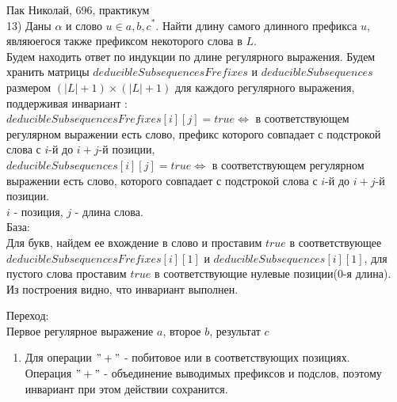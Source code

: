 \documentclass{article}
\begin{document}
	\LARGE
	\begin{flushleft}
		Пак Николай, 696, практикум \\
		13)  Даны $\alpha$ и слово $u \in {a,b,c}^*$. Найти длину самого длинного префикса $u$, являюегося также префиксом некоторого слова в $L$.\\
		
		
		Будем находить ответ по индукции по длине регулярного выражения. Будем хранить матрицы $deducibleSubsequencesFrefixes$ и $deducibleSubsequences$ размером  $(|L| + 1) \times (|L| + 1)$ для каждого регулярного выражения, поддерживая инвариант :\\ $deducibleSubsequencesFrefixes[i][j] = true \Leftrightarrow$ в соответствующем регулярном выражении есть слово, префикс которого совпадает с подстрокой слова с $i$-й до $i+j$-й позиции,\\
		$deducibleSubsequences[i][j] = true \Leftrightarrow$ в соответствующем регулярном выражении есть слово, которого совпадает с подстрокой слова с $i$-й до $i+j$-й позиции.\\
		$i$ - позиция, $j$ - длина слова.\\ 
		База:\\
		Для букв, найдем ее вхождение в слово и проставим $true$ в соответствующее $deducibleSubsequencesFrefixes[i][1]$ и $deducibleSubsequences[i][1]$, для пустого слова проставим $true$ в соответствующие нулевые позиции(0-я длина). \\
		Из построения видно, что инвариант выполнен.
		
		Переход:\\

		Первое регулярное выражение $a$, второе $b$, результат $c$\\
		\begin{enumerate}
			\item
				Для операции $"+"$ - побитовое или в соответствующих позициях.\\
				Операция $"+"$ - объединение выводимых префиксов и подслов, поэтому инвариант при этом действии сохранится.
				

\end{enumerate}
\end{flushleft}
\end{document}
